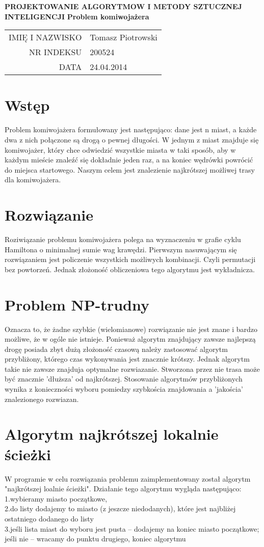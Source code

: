 \documentclass[10pt,oneside]{mwbk}
\renewcommand {\maketitle}{
\begin {titlepage}
\begin {center}
	\LARGE
	\textbf {PROJEKTOWANIE ALGORYTMOW I METODY SZTUCZNEJ INTELIGENCJI}
	\newline
	\newline
	\textbf{ Problem komiwojażera}
	\newline
	\begin{table}
	\begin{center}
	\begin{tabular}{rl}
	IMIĘ I NAZWISKO & Tomasz Piotrowski \\
	NR INDEKSU & 200524 \\	
	DATA  & 24.04.2014 \\
	\end{tabular}

	\end{center}
	\end{table}
\end {center}
\end {titlepage}}
\begin{document}
\maketitle
\section{Wstęp}
	
	\indent Problem komiwojażera formułowany jest następująco: dane jest n miast, a każde dwa z nich połączone są drogą o pewnej długości. W jednym z miast znajduje się komiwojażer, który chce odwiedzić wszystkie miasta w taki sposób, aby w każdym mieście znaleźć się dokładnie jeden raz, a na koniec wędrówki powrócić do miejsca startowego. Naszym celem jest znalezienie najkrótszej możliwej trasy dla komiwojażera.

	
\section {Rozwiązanie}

Roziwiązanie problemu komiwojażera polega na wyznaczeniu w grafie cyklu Hamiltona o minimalnej sumie wag krawędzi. Pierwszym nasuwającym się rozwiązaniem jest policzenie wszystkich możliwych kombinacji. Czyli permutacji bez powtorzeń. Jednak złożoność obliczeniowa tego algorytmu jest wykładnicza.
 

\section {Problem NP-trudny}
Oznacza to, że żadne szybkie (wielomianowe) rozwiązanie
nie jest znane i bardzo możliwe, że w ogóle nie istnieje.
Ponieważ algorytm znajdujący zawsze najlepszą drogę posiada zbyt dużą złożoność czasową należy zastosować algorytm przybliżony, którego czas wykonywania jest znacznie krótszy. Jednak algorytm takie nie zawsze znajduja optymalne rozwiazanie. Stworzona przez nie trasa może być znacznie 'dłuższa' od najkrótszej. Stosowanie algorytmów przybliżonych wynika z konieczności wyboru pomiedzy szybkościa znajdowania a 'jakościa' znalezionego rozwiazan. 

\section {Algorytm najkrótszej lokalnie ścieżki}
W programie w celu rozwiązania problemu zaimplementowany został algorytm "najkrótszej loalnie ścieżki". 
Działanie tego algorytmu wygląda następująco:\\
1.wybieramy miasto początkowe,\\
2.do listy dodajemy to miasto (z jeszcze
niedodanych), które jest najbliżej ostatniego
dodanego do listy\\
3.jeśli lista miast do wyboru jest pusta –
dodajemy na koniec miasto początkowe; jeśli
nie – wracamy do punktu drugiego,
koniec algorytmu\\
\end{document}
